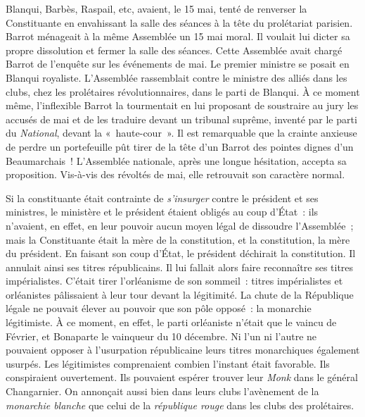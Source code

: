 \documentclass[twoside]{book} %
\begin{document}
Blanqui, Barbès, Raspail, etc, avaient, le 15 mai, tenté de renverser la Constituante en envahissant la salle des séances à la tête du prolétariat parisien. Barrot ménageait à la même Assemblée un 15 mai moral. Il voulait lui dicter sa propre dissolution et fermer la salle des séances. Cette Assemblée avait chargé Barrot de l’enquête sur les événements de mai. Le premier ministre se posait en Blanqui royaliste. L’Assemblée rassemblait contre le ministre des alliés dans les clubs, chez les prolétaires révolutionnaires, dans le parti de Blanqui. À ce moment même, l’inflexible Barrot la tourmentait en lui proposant de soustraire au jury les accusés de mai et de les traduire devant un tribunal suprême, inventé par le parti du \emph{National}, devant la « haute-cour ». Il est remarquable que la crainte anxieuse de perdre un portefeuille pût tirer de la tête d’un Barrot des pointes dignes d’un Beaumarchais ! L’Assemblée nationale, après une longue hésitation, accepta sa proposition. Vis-à-vis des révoltés de mai, elle retrouvait son caractère normal.\par
Si la constituante était contrainte de \emph{s’insurger} contre le président et ses ministres, le ministère et le président étaient obligés au coup d’État : ils n’avaient, en effet, en leur pouvoir aucun moyen légal de dissoudre l’Assemblée ; mais la Constituante était la mère de la constitution, et la constitution, la mère du président. En faisant son coup d’État, le président déchirait la constitution. Il annulait ainsi ses titres républicains. Il lui fallait alors faire reconnaître ses titres impérialistes. C’était tirer l’orléanisme de son sommeil : titres impérialistes et orléanistes pâlissaient à leur tour devant la légitimité. La chute de la République légale ne pouvait élever au pouvoir que son pôle opposé : la monarchie légitimiste. À ce moment, en effet, le parti orléaniste n’était que le vaincu de Février, et Bonaparte le vainqueur du 10 décembre. Ni l’un ni l’autre ne pouvaient opposer à l’usurpation républicaine leurs titres monarchiques également usurpés. Les légitimistes comprenaient combien l’instant était favorable. Ils conspiraient ouvertement. Ils pouvaient espérer trouver leur \emph{Monk} dans le général Changarnier. On annonçait aussi bien dans leurs clubs l’avènement de la \emph{monarchie blanche} que celui de la \emph{république rouge} dans les clubs des prolétaires.\par
\end{document}

